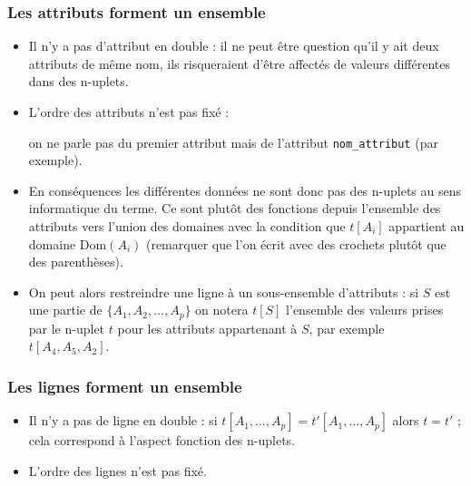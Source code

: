 \subsubsection{Les attributs forment un ensemble}
\begin{itemize}
\item Il n'y a pas d'attribut en double : il ne peut être question qu'il y ait deux attributs de même nom, ils risqueraient d'être affectés de valeurs différentes dans des n-uplets.
\item L'ordre des attributs n'est pas fixé : 

on ne parle pas du premier attribut mais de l'attribut {\tt nom\_attribut} (par exemple).
\item En conséquences les différentes données ne sont donc pas des n-uplets au sens informatique du terme. Ce sont plutôt des fonctions depuis l'ensemble des attributs vers l'union des domaines avec la condition que $t[A_i]$ appartient au domaine $\text{Dom}(A_i)$ (remarquer que l'on écrit avec des crochets plutôt que des parenthèses).
\item On peut alors restreindre une ligne à un sous-ensemble d'attributs : si $S$ est une partie de $\{A_1,A_2,\ldots,A_p\}$ on notera $t[S]$ l'ensemble des valeurs prises par le n-uplet $t$ pour les attributs appartenant à $S$, par exemple 
$t[A_4,A_5,A_2]$.
\end{itemize}
\subsubsection{Les lignes forment un ensemble}
\begin{itemize}
\item Il n'y a pas de ligne en double : si $t[A_1,\ldots,A_p]=t'[A_1,\ldots,A_p]$ alors $t=t'$ ; cela correspond à l'aspect fonction des n-uplets.
\item L'ordre des lignes n'est pas fixé.
\end{itemize}

